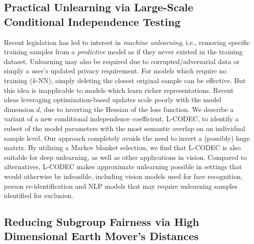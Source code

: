 \subsection{Practical Unlearning via Large-Scale Conditional Independence Testing}

Recent legislation has
led to interest in {\em machine unlearning}, i.e., removing specific training samples from a {\em predictive} model as if they never existed in the training dataset. 
Unlearning may also be required due to  corrupted/adversarial data or simply a user's updated privacy requirement.
For models which require no training ($k$-NN), 
simply deleting the closest original sample can be effective. 
But this idea is inapplicable to models which learn richer 
representations.
Recent ideas leveraging optimization-based updates
scale poorly with the model dimension $d$,  
due to 
inverting the Hessian of the loss function. %
We describe
a variant of a new conditional independence coefficient, 
L-CODEC, to identify a subset of the model parameters with the most semantic overlap on an individual sample level. 
Our approach completely avoids the need to invert a (possibly) huge matrix. 
By utilizing a Markov blanket selection, 
we find
that L-CODEC is also suitable for deep unlearning,
as well as other applications in vision.
Compared to alternatives, L-CODEC makes approximate unlearning possible 
in settings that would otherwise be infeasible, 
including vision models used for face recognition, 
person re-identification 
and NLP models that may require unlearning samples identified for exclusion.


\subsection{Reducing Subgroup Fairness via High Dimensional Earth Mover's Distances}

